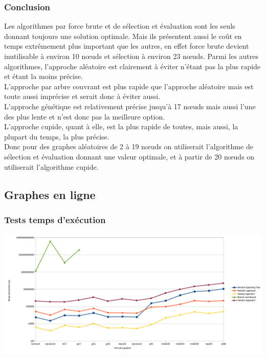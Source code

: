 \documentclass[10pt,a4paper]{report}
\begin{document}
		\subsubsection{Conclusion}
		Les algorithmes par force brute et de sélection et évaluation sont les seuls donnant toujours une solution optimale. Mais ils présentent aussi le coût en temps extrêmement plus important que les autres, en effet force brute devient inutilisable à environ 10 nœuds et sélection à environ 23 nœuds.
		Parmi les autres algorithmes, l'approche aléatoire est clairement à éviter n'étant pas la plus rapide et étant la moins précise.\\
		L'approche par arbre couvrant est plus rapide que l'approche aléatoire mais est toute aussi imprécise et serait donc à éviter aussi.\\
		L'approche génétique est relativement précise jusqu'à 17 nœuds mais aussi l'une des plus lente et n'est donc pas la meilleure option.\\
		L'approche cupide, quant à elle, est la plus rapide de toutes, mais aussi, la plupart du temps, la plus précise.\\
		
		Donc pour des graphes aléatoires de 2 à 19 nœuds on utiliserait l'algorithme de sélection et évaluation donnant une valeur optimale, et à partir de 20 nœuds on utiliserait l'algorithme cupide.
			
	\subsection{Graphes en ligne}
		\subsubsection{Tests temps d'exécution}
			\includegraphics[scale=0.45]{./Ressource/temps_graphes_site.png}
		
	
\end{document}
